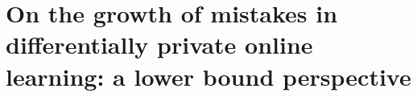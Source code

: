 \chapter[Lower bounds for private online learning]{On the growth of mistakes in differentially private online learning: a lower bound perspective}
% 



